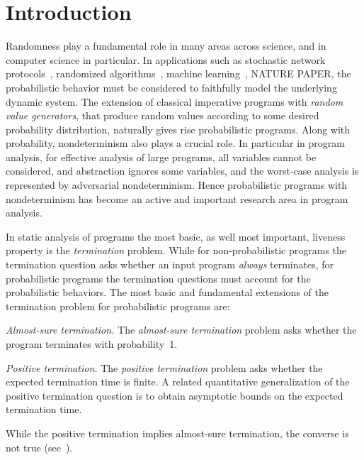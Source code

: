 

\section{Introduction}\label{sec:introduction}


Randomness play a fundamental role in many areas across science, and in 
computer science in particular.
In applications such as stochastic network protocols~\cite{BaierBook,prism},
randomized algorithms~\cite{RandBook,RandBook2}, machine learning~\cite{},
NATURE PAPER, the probabilistic behavior must be considered to faithfully model
the underlying dynamic system.
The extension of classical imperative programs with \emph{random value generators}, 
that produce random values according to some desired probability distribution, 
naturally gives rise probabilistic programs.
Along with probability, nondeterminism also plays a crucial role.
In particular in program analysis, for effective analysis of large programs,
all variables cannot be considered, and abstraction ignores some variables,
and the worst-case analysis is represented by adversarial nondeterminism.
Hence probabilistic programs with nondeterminism has become an active and 
important research area in program analysis. 
 


\smallskip{} 
In static analysis of programs the most basic, as well most important, 
liveness property is the {\em termination} problem.
While for non-probabilistic programs the termination question asks whether
an input program {\em always} terminates, for probabilistic programs 
the termination questions must account for the probabilistic behaviors. 
The most basic and fundamental extensions of the termination problem 
for probabilistic programs are:

\begin{compactenum}
\item \emph{Almost-sure termination.} 
The \emph{almost-sure termination} problem asks whether the program terminates with probability~1.


\item \emph{Positive termination.} 
The \emph{positive termination} problem asks whether the expected termination time is finite.
A related quantitative generalization of the positive termination question is to obtain 
asymptotic bounds on the expected termination time.

\end{compactenum}
While the positive termination implies almost-sure termination, the converse is not true (see~\cite[]{}).




